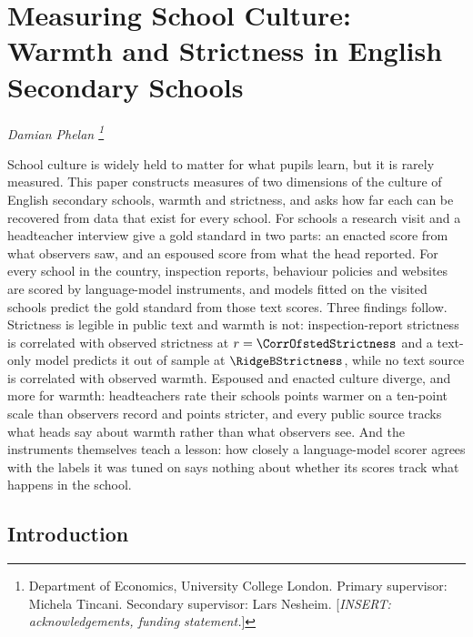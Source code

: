 \chapter{Measuring School Culture: Warmth and Strictness in English Secondary Schools}
\label{ch:paper1}
\resetcounterformats

\begin{center}
  \textit{Damian Phelan%
    \thanks{Department of Economics, University College London.
      Primary supervisor: Michela Tincani. Secondary supervisor: Lars Nesheim.
      [\textit{INSERT: acknowledgements, funding statement.}]}}
\end{center}

\begin{chapterabstract}
School culture is widely held to matter for what pupils learn, but it is
rarely measured. This paper constructs measures of two dimensions of the
culture of English secondary schools, warmth and strictness, and asks how far
each can be recovered from data that exist for every school. For \NTierOne{}
schools a research visit and a headteacher interview give a gold standard in
two parts: an enacted score from what observers saw, and an espoused score
from what the head reported. For every school in the country, inspection
reports, behaviour policies and websites are scored by language-model
instruments, and models fitted on the visited schools predict the gold
standard from those text scores. Three findings follow. Strictness is legible
in public text and warmth is not: inspection-report strictness is correlated
with observed strictness at $r = \CorrOfstedStrictness$ and a text-only model
predicts it out of sample at $\RidgeBStrictness$, while no text source is
correlated with observed warmth. Espoused and enacted culture diverge, and
more for warmth: headteachers rate their schools \GapWarmth{} points warmer on
a ten-point scale than observers record and \GapStrictness{} points stricter,
and every public source tracks what heads say about warmth rather than what
observers see. And the instruments themselves teach a lesson: how closely a
language-model scorer agrees with the labels it was tuned on says nothing
about whether its scores track what happens in the school.
\end{chapterabstract}

\section{Introduction}
\label{sec:p1_intro}

